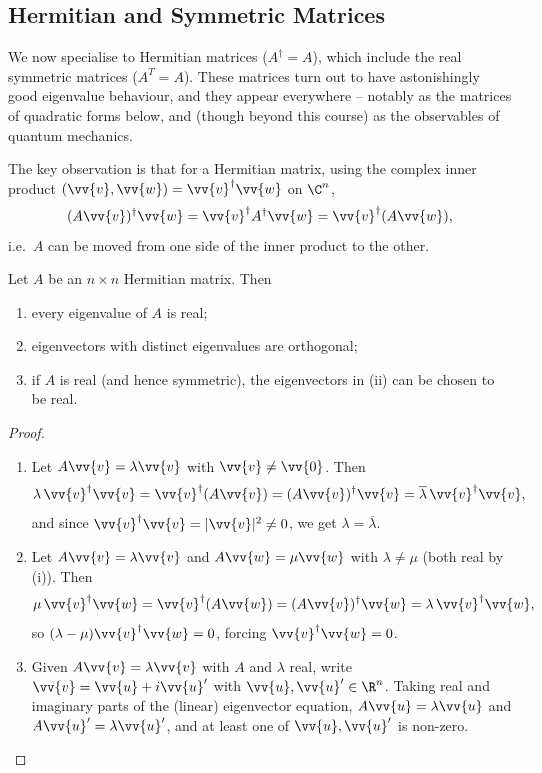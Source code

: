 \subsection{Hermitian and Symmetric Matrices}

We now specialise to Hermitian matrices ($A^\dagger = A$), which include the real symmetric matrices ($A^T = A$). These matrices turn out to have astonishingly good eigenvalue behaviour, and they appear everywhere -- notably as the matrices of quadratic forms below, and (though beyond this course) as the observables of quantum mechanics.

The key observation is that for a Hermitian matrix, using the complex inner product $(\vv{v}, \vv{w}) = \vv{v}^\dagger \vv{w}$ on $\C^n$,
$$
(A \vv{v})^\dagger \vv{w} = \vv{v}^\dagger A^\dagger \vv{w} = \vv{v}^\dagger (A \vv{w}),
$$
i.e.\ $A$ can be moved from one side of the inner product to the other.

\begin{theorem}
	Let $A$ be an $n \times n$ Hermitian matrix. Then
	\begin{enumerate}[label=(\roman*)]
		\item every eigenvalue of $A$ is real;
		\item eigenvectors with distinct eigenvalues are orthogonal;
		\item if $A$ is real (and hence symmetric), the eigenvectors in (ii) can be chosen to be real.
	\end{enumerate}
\end{theorem}
\begin{proof}
	\begin{enumerate}[label=(\roman*)]
		\item Let $A \vv{v} = \lambda \vv{v}$ with $\vv{v} \neq \vv{0}$. Then
		$$
		\lambda\, \vv{v}^\dagger \vv{v} = \vv{v}^\dagger (A\vv{v}) = (A \vv{v})^\dagger \vv{v} = \overline{\lambda}\, \vv{v}^\dagger\vv{v},
		$$
		and since $\vv{v}^\dagger \vv{v} = |\vv{v}|^2 \neq 0$, we get $\lambda = \overline{\lambda}$.
		\item Let $A \vv{v} = \lambda \vv{v}$ and $A \vv{w} = \mu \vv{w}$ with $\lambda \neq \mu$ (both real by (i)). Then
		$$
		\mu \, \vv{v}^\dagger \vv{w} = \vv{v}^\dagger(A \vv{w}) = (A \vv{v})^\dagger \vv{w} = \lambda\, \vv{v}^\dagger \vv{w},
		$$
		so $(\lambda - \mu)\vv{v}^\dagger \vv{w} = 0$, forcing $\vv{v}^\dagger \vv{w} = 0$.
		\item Given $A \vv{v} = \lambda \vv{v}$ with $A$ and $\lambda$ real, write $\vv{v} = \vv{u} + i \vv{u}'$ with $\vv{u}, \vv{u}' \in \R^n$. Taking real and imaginary parts of the (linear) eigenvector equation, $A \vv{u} = \lambda \vv{u}$ and $A \vv{u}' = \lambda \vv{u}'$, and at least one of $\vv{u}, \vv{u}'$ is non-zero. \qedhere
	\end{enumerate}
\end{proof}

